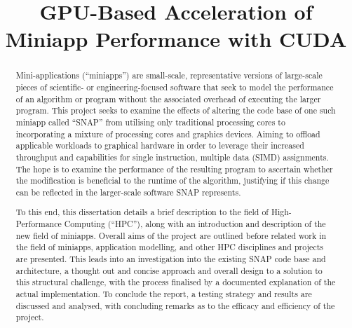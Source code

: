 \documentclass[conference]{IEEEtran}
\begin{document}
\title{GPU-Based Acceleration of Miniapp Performance with CUDA}


\author{
}


\maketitle


\begin{abstract}

Mini-applications (``miniapps'') are small-scale, representative versions of large-scale pieces of scientific- or engineering-focused software that seek to model the performance of an algorithm or program without the associated overhead of executing the larger program. This project seeks to examine the effects of altering the code base of one such miniapp called ``SNAP'' from utilising only traditional processing cores to incorporating a mixture of processing cores and graphics devices. Aiming to offload applicable workloads to graphical hardware in order to leverage their increased throughput and capabilities for single instruction, multiple data (SIMD) assignments. The hope is to examine the performance of the resulting program to ascertain whether the modification is beneficial to the runtime of the algorithm, justifying if this change can be reflected in the larger-scale software SNAP represents.

To this end, this dissertation details a brief description to the field of High-Performance Computing (``HPC''), along with an introduction and description of the new field of miniapps. Overall aims of the project are outlined before related work in the field of miniapps, application modelling, and other HPC disciplines and projects are presented. This leads into an investigation into the existing SNAP code base and architecture, a thought out and concise approach and overall design to a solution to this structural challenge, with the process finalised by a documented explanation of the actual implementation. To conclude the report, a testing strategy and results are discussed and analysed, with concluding remarks as to the efficacy and efficiency of the project.

\end{abstract}

\end{document}
